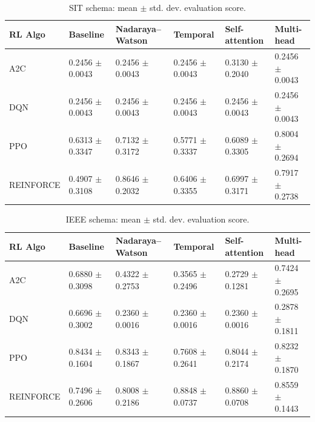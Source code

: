 \documentclass[sn-basic]{sn-jnl}%
\begin{document}
\begin{table}[htbp]
	\centering
	\caption{SIT schema: mean $\pm$ std. dev. evaluation score.}
	\label{tab:sit_main_results}
	\begin{tabular}{l l l l l l}
	\toprule
	\textbf{RL Algo} & \textbf{Baseline} & \textbf{Nadaraya--Watson} & \textbf{Temporal} & \textbf{Self-attention} & \textbf{Multi-head}\\
	\midrule
	A2C & 0.2456 $\pm$ 0.0043 & 0.2456 $\pm$ 0.0043 & 0.2456 $\pm$ 0.0043 & 0.3130 $\pm$ 0.2040 & 0.2456 $\pm$ 0.0043\\
	DQN & 0.2456 $\pm$ 0.0043 & 0.2456 $\pm$ 0.0043 & 0.2456 $\pm$ 0.0043 & 0.2456 $\pm$ 0.0043 & 0.2456 $\pm$ 0.0043\\
	PPO & 0.6313 $\pm$ 0.3347 & 0.7132 $\pm$ 0.3172 & 0.5771 $\pm$ 0.3337 & 0.6089 $\pm$ 0.3305 & 0.8004 $\pm$ 0.2694\\
	REINFORCE & 0.4907 $\pm$ 0.3108 & 0.8646 $\pm$ 0.2032 & 0.6406 $\pm$ 0.3355 & 0.6997 $\pm$ 0.3171 & 0.7917 $\pm$ 0.2738\\
	\bottomrule
	\end{tabular}
\end{table}

\begin{table}[htbp]
	\centering
	\caption{IEEE schema: mean $\pm$ std. dev. evaluation score.}
	\label{tab:ieee_main_results}
	\begin{tabular}{l l l l l l}
	\toprule
	\textbf{RL Algo} & \textbf{Baseline} & \textbf{Nadaraya--Watson} & \textbf{Temporal} & \textbf{Self-attention} & \textbf{Multi-head}\\
	\midrule
	A2C & 0.6880 $\pm$ 0.3098 & 0.4322 $\pm$ 0.2753 & 0.3565 $\pm$ 0.2496 & 0.2729 $\pm$ 0.1281 & 0.7424 $\pm$ 0.2695\\
	DQN & 0.6696 $\pm$ 0.3002 & 0.2360 $\pm$ 0.0016 & 0.2360 $\pm$ 0.0016 & 0.2360 $\pm$ 0.0016 & 0.2878 $\pm$ 0.1811\\
	PPO & 0.8434 $\pm$ 0.1604 & 0.8343 $\pm$ 0.1867 & 0.7608 $\pm$ 0.2641 & 0.8044 $\pm$ 0.2174 & 0.8232 $\pm$ 0.1870\\
	REINFORCE & 0.7496 $\pm$ 0.2606 & 0.8008 $\pm$ 0.2186 & 0.8848 $\pm$ 0.0737 & 0.8860 $\pm$ 0.0708 & 0.8559 $\pm$ 0.1443\\
	\bottomrule
	\end{tabular}
\end{table}
\end{document}
